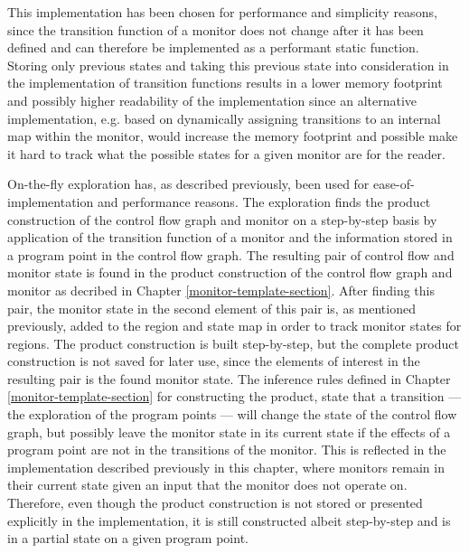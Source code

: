 \newpar This implementation has been chosen for performance and simplicity reasons, since the transition function of a monitor does not change after it has been defined and can therefore be implemented as a performant static function. Storing only previous states and taking this previous state into consideration in the implementation of transition functions results in a lower memory footprint and possibly higher readability of the implementation since an alternative implementation, e.g. based on dynamically assigning transitions to an internal map within the monitor, would increase the memory footprint and possible make it hard to track what the possible states for a given monitor are for the reader.

\newpar On-the-fly exploration has, as described previously, been used for ease-of-implementation and performance reasons. The exploration finds the product construction of the control flow graph and monitor on a step-by-step basis by application of the transition function of a monitor and the information stored in a program point in the control flow graph. The resulting pair of control flow and monitor state is found in the product construction of the control flow graph and monitor as decribed in Chapter \ref{monitor-template-section}. After finding this pair, the monitor state in the second element of this pair is, as mentioned previously, added to the region and state map in order to track monitor states for regions. The product construction is built step-by-step, but the complete product construction is not saved for later use, since the elements of interest in the resulting pair is the found monitor state. The inference rules defined in Chapter \ref{monitor-template-section} for constructing the product, state that a transition --- the exploration of the program points --- will change the state of the control flow graph, but possibly leave the monitor state in its current state if the effects of a program point are not in the transitions of the monitor. This is reflected in the implementation described previously in this chapter, where monitors remain in their current state given an input that the monitor does not operate on. Therefore, even though the product construction is not stored or presented explicitly in the implementation, it is still constructed albeit step-by-step and is in a partial state on a given program point.

